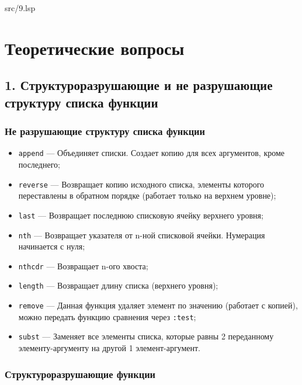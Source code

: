 \FloatBarrier
\begin{lstinputlisting}[style={lsp}]{src/9.lsp}
\end{lstinputlisting}
\FloatBarrier

\chapter*{Теоретические вопросы}

\section*{1. Структуроразрушающие и не разрушающие структуру списка функции}

\subsection*{Не разрушающие структуру списка функции}

\begin{itemize}
	\item \texttt{append} --- Объединяет списки. Создает копию для всех аргументов, кроме последнего;
	
	\item \texttt{reverse} --- Возвращает копию исходного списка, элементы которого переставлены в обратном порядке (работает только на верхнем уровне);
	
	\item \texttt{last} --- Возвращает последнюю списковую ячейку верхнего уровня;
	
	\item \texttt{nth} --- Возвращает указателя от n-ной списковой ячейки. Нумерация начинается с нуля;
	
	\item \texttt{nthcdr} --- Возвращает n-ого хвоста;
	
	\item \texttt{length} --- Возвращает длину списка (верхнего уровня);
	
	\item \texttt{remove} --- Данная функция удаляет элемент по значению (работает с копией), можно передать функцию сравнения через \texttt{:test};
	
	\item \texttt{subst} --- Заменяет все элементы списка, которые равны 2 переданному элементу-аргументу на другой 1 элемент-аргумент.	
\end{itemize}

\subsection*{Структуроразрушающие функции}

